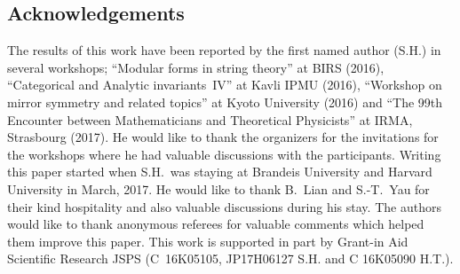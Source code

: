 \documentclass[10pt,a4paper]{amsart}
\numberwithin{equation}{section}
\begin{document}
\subsection*{Acknowledgements} The results of this work have been reported by the first named author (S.H.) in several workshops; ``Modular forms in string theory'' at BIRS (2016), ``Categorical and Analytic invariants~IV'' at Kavli IPMU (2016), ``Workshop on mirror symmetry and related topics'' at Kyoto University (2016) and ``The 99th Encounter between Mathematicians and Theoretical Physicists'' at IRMA, Strasbourg (2017). He would like to thank the organizers for the invitations for the workshops where he had valuable discussions with the participants. Writing this paper started when S.H.~was staying at Brandeis University and Harvard University in March, 2017. He would like to thank B.~Lian and S.-T.~Yau for their kind hospitality and also valuable discussions during his stay. The authors would like to thank anonymous referees for valuable comments which helped them improve this paper. This work is supported in part by Grant-in Aid Scientific Research JSPS (C~16K05105, JP17H06127 S.H. and C 16K05090 H.T.).

\end{document}
